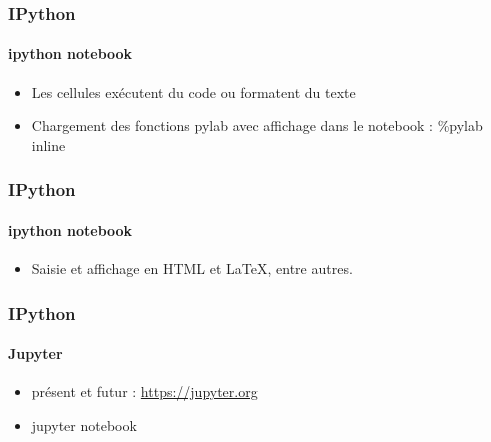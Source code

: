 \begin{frame}[fragile]
\frametitle{IPython}
\framesubtitle{ipython notebook}
\begin{itemize}
 \item Les cellules exécutent du code ou formatent du texte
 \item Chargement des fonctions pylab avec affichage dans le notebook : \%pylab inline 
\end{itemize}
\begin{center}
\end{center}
\end{frame}
\begin{frame}[fragile]
\frametitle{IPython}
\framesubtitle{ipython notebook}
\begin{itemize}
 \item Saisie et affichage en HTML et LaTeX, entre autres.   
\end{itemize}
\begin{center}
\end{center}
\end{frame}
\begin{frame}[fragile]
\frametitle{IPython}
\framesubtitle{Jupyter}
\begin{itemize}
 \item présent et futur : \url{https://jupyter.org} 
 \item jupyter notebook
\end{itemize}
\begin{center}
\end{center}
\end{frame}
